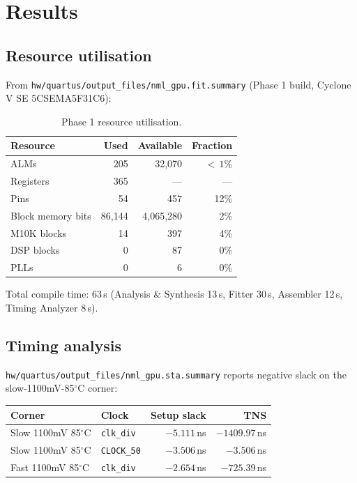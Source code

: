 \documentclass[11pt,letterpaper]{article}
\begin{document}
\section{Results}

\subsection{Resource utilisation}

From \texttt{hw/quartus/output\_files/nml\_gpu.fit.summary} (Phase 1 build,
Cyclone V SE 5CSEMA5F31C6):

\begin{table}[h]
\centering
\begin{tabular}{lrrr}
\toprule
Resource & Used & Available & Fraction \\
\midrule
ALMs & 205 & 32{,}070 & $<\,1\%$ \\
Registers & 365 & --- & --- \\
Pins & 54 & 457 & 12\% \\
Block memory bits & 86{,}144 & 4{,}065{,}280 & 2\% \\
M10K blocks & 14 & 397 & 4\% \\
DSP blocks & 0 & 87 & 0\% \\
PLLs & 0 & 6 & 0\% \\
\bottomrule
\end{tabular}
\caption{Phase 1 resource utilisation.}
\end{table}

Total compile time: 63\,s (Analysis \& Synthesis 13\,s, Fitter 30\,s,
Assembler 12\,s, Timing Analyzer 8\,s).

\subsection{Timing analysis}

\texttt{hw/quartus/output\_files/nml\_gpu.sta.summary} reports negative slack
on the slow-1100mV-85$^\circ$C corner:

\begin{table}[h]
\centering
\begin{tabular}{llrr}
\toprule
Corner & Clock & Setup slack & TNS \\
\midrule
Slow 1100mV 85$^\circ$C & \texttt{clk\_div} & $-5.111$\,ns & $-1409.97$\,ns \\
Slow 1100mV 85$^\circ$C & \texttt{CLOCK\_50} & $-3.506$\,ns & $-3.506$\,ns \\
Fast 1100mV 85$^\circ$C & \texttt{clk\_div} & $-2.654$\,ns & $-725.39$\,ns \\
\bottomrule
\end{tabular}
\end{table}
\end{document}
